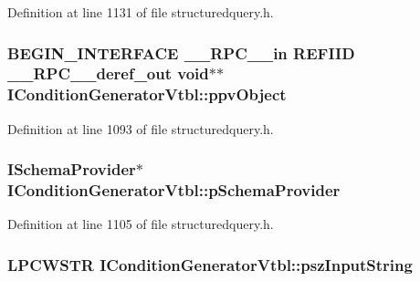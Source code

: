 Definition at line 1131 of file structuredquery.\+h.

\subsubsection[{\texorpdfstring{ppv\+Object}{ppvObject}}]{\setlength{\rightskip}{0pt plus 5cm}B\+E\+G\+I\+N\+\_\+\+I\+N\+T\+E\+R\+F\+A\+CE {\bf \+\_\+\+\_\+\+R\+P\+C\+\_\+\+\_\+in} {\bf R\+E\+F\+I\+ID} {\bf \+\_\+\+\_\+\+R\+P\+C\+\_\+\+\_\+deref\+\_\+out} {\bf void}$\ast$$\ast$ I\+Condition\+Generator\+Vtbl\+::ppv\+Object}\hypertarget{struct_i_condition_generator_vtbl_a2966f7d014ecacc1a3ba0925075cfcac}{}\label{struct_i_condition_generator_vtbl_a2966f7d014ecacc1a3ba0925075cfcac}


Definition at line 1093 of file structuredquery.\+h.

\subsubsection[{\texorpdfstring{p\+Schema\+Provider}{pSchemaProvider}}]{ {\bf I\+Schema\+Provider}$\ast$ I\+Condition\+Generator\+Vtbl\+::p\+Schema\+Provider}\hypertarget{struct_i_condition_generator_vtbl_a56ac16fcad4f676b514fa7c3b581764c}{}\label{struct_i_condition_generator_vtbl_a56ac16fcad4f676b514fa7c3b581764c}


Definition at line 1105 of file structuredquery.\+h.

\subsubsection[{\texorpdfstring{psz\+Input\+String}{pszInputString}}]{ {\bf L\+P\+C\+W\+S\+TR} I\+Condition\+Generator\+Vtbl\+::psz\+Input\+String}\hypertarget{struct_i_condition_generator_vtbl_a44dfba63ee2165e107db360a7b5e7272}{}\label{struct_i_condition_generator_vtbl_a44dfba63ee2165e107db360a7b5e7272}


